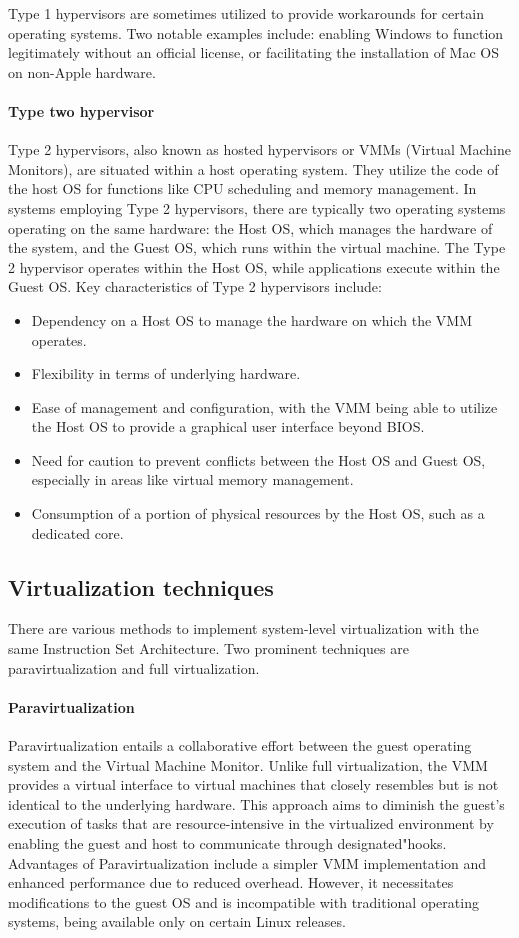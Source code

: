Type 1 hypervisors are sometimes utilized to provide workarounds for certain operating systems. 
Two notable examples include: enabling Windows to function legitimately without an official license, or facilitating the installation of Mac OS on non-Apple hardware. 

\paragraph*{Type two hypervisor}
Type 2 hypervisors, also known as hosted hypervisors or VMMs (Virtual Machine Monitors), are situated within a host operating system. 
They utilize the code of the host OS for functions like CPU scheduling and memory management.
In systems employing Type 2 hypervisors, there are typically two operating systems operating on the same hardware: the Host OS, which manages the hardware of the system, and the Guest OS, which runs within the virtual machine.
The Type 2 hypervisor operates within the Host OS, while applications execute within the Guest OS.
Key characteristics of Type 2 hypervisors include:
\begin{itemize}
    \item Dependency on a Host OS to manage the hardware on which the VMM operates.
    \item Flexibility in terms of underlying hardware.
    \item Ease of management and configuration, with the VMM being able to utilize the Host OS to provide a graphical user interface beyond BIOS.
    \item Need for caution to prevent conflicts between the Host OS and Guest OS, especially in areas like virtual memory management.
    \item Consumption of a portion of physical resources by the Host OS, such as a dedicated core.
\end{itemize}

\subsection{Virtualization techniques}
There are various methods to implement system-level virtualization with the same Instruction Set Architecture. 
Two prominent techniques are paravirtualization and full virtualization.

\paragraph*{Paravirtualization}
Paravirtualization entails a collaborative effort between the guest operating system and the Virtual Machine Monitor. 
Unlike full virtualization, the VMM provides a virtual interface to virtual machines that closely resembles but is not identical to the underlying hardware. 
This approach aims to diminish the guest's execution of tasks that are resource-intensive in the virtualized environment by enabling the guest and host to communicate through designated"hooks.
Advantages of Paravirtualization include a simpler VMM implementation and enhanced performance due to reduced overhead. 
However, it necessitates modifications to the guest OS and is incompatible with traditional operating systems, being available only on certain Linux releases.

